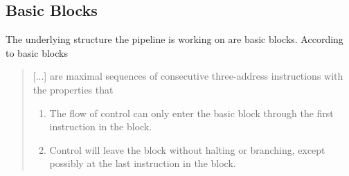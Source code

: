 \subsection{Basic Blocks}\label{subsec:basicBlock}
The underlying structure the pipeline is working on are basic blocks.
According to \cite[chapter 8.4, p.~525]{Drachenbuch} basic blocks

\begin{quotation}
    [...] are maximal sequences of consecutive three-address instructions with the properties that
    \begin{enumerate}[label=(\alph*)]
        \item The flow of control can only enter the basic block through the first instruction in the block.
        \item Control will leave the block without halting or branching, except possibly at the last instruction in the block.
    \end{enumerate}
\end{quotation}

